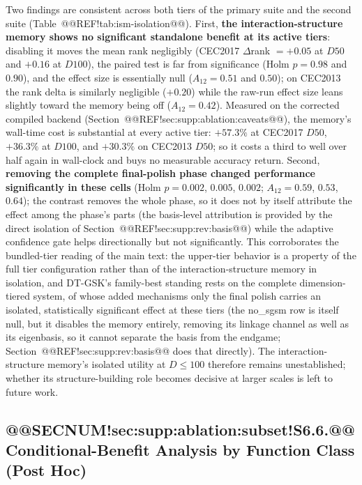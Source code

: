 \documentclass[10pt,a4paper]{article}
\newcommand{\dtgsk}{DT-GSK}
\begin{document}
Two findings are consistent across both tiers of the primary suite and the
second suite (Table~@@REF!tab:ism-isolation@@).  First, \textbf{the
interaction-structure memory shows no
significant standalone benefit at its active tiers}: disabling it moves the mean
rank negligibly (CEC2017 $\Delta$rank $= +0.05$ at $D50$ and $+0.16$ at $D100$),
the paired test is far from significance (Holm $p = 0.98$ and $0.90$), and the
effect size is essentially null ($A_{12} = 0.51$ and $0.50$); on CEC2013 the
rank delta is similarly negligible ($+0.20$) while the raw-run effect size
leans slightly toward the memory being off ($A_{12} = 0.42$).  Measured on the
corrected compiled backend (Section~@@REF!sec:supp:ablation:caveats@@), the
memory's wall-time cost is substantial at every active tier:
$\mathbf{{+}57.3\%}$ at CEC2017 $D50$, $\mathbf{{+}36.3\%}$ at $D100$, and
$+30.3\%$ on CEC2013 $D50$; so it costs a third to well over half again in
wall-clock and buys no measurable accuracy return.  Second,
\textbf{removing the complete final-polish phase changed performance
significantly in these cells} (Holm $p = 0.002$, $0.005$, $0.002$;
$A_{12} = 0.59$, $0.53$, $0.64$); the contrast removes the whole phase, so it
does not by itself attribute the effect among the phase's parts (the
basis-level attribution is provided by the direct isolation of
Section~@@REF!sec:supp:rev:basis@@) while the adaptive confidence gate helps directionally but not
significantly.  This corroborates the bundled-tier reading of the main text: the
upper-tier behavior is a property of the full tier configuration rather
than of the interaction-structure memory in isolation, and \dtgsk{}'s
family-best standing rests on the complete dimension-tiered system, of whose
added mechanisms only the final polish carries an isolated, statistically
significant effect at these tiers (the no\_sgsm row is itself null, but it
disables the memory entirely, removing its linkage channel as well as its
eigenbasis, so it cannot separate the basis from the endgame;
Section~@@REF!sec:supp:rev:basis@@ does that directly).  The interaction-structure memory's isolated
utility at $D \le 100$ therefore remains unestablished; whether its
structure-building role becomes decisive at larger scales is left to future work.




\subsection{@@SECNUM!sec:supp:ablation:subset!S6.6.@@ Conditional-Benefit Analysis by Function Class (Post Hoc)}\label{sec:supp:ablation:subset}
\end{document}
